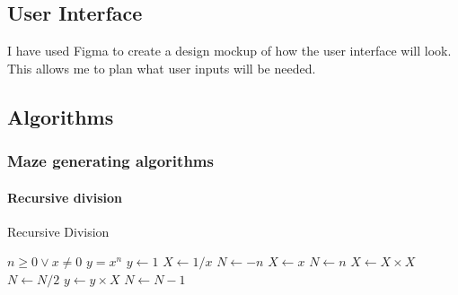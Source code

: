 \documentclass{article}
\newcommand{\comment}[1]{}
\begin{document}
\comment{
\begin{tikzpicture}[node distance = 2cm, auto]
    \node[start] (init) {start};
    \node [io, below of = init] (1) {User selects maze algorithm};
    \node[block, below of = 1] (2) {Generate maze using selected algorithm};
    \node [io, below of=2](3){User selects path finding algorithm};
    \node[decision, below of=3](4){Start button pressed?};
    \node[block, below of=4, yshift=-1cm](5){Visualization runs};
    \node[decision, below of=5](6){Reset button pressed?};
    \node[decision, right of=6, xshift=1cm](7){Nodes moved?};
    \node[block, below of=7, xshift=0.25cm, yshift=-0.5cm](8){Update visualization};
    \node[block, below of=6, yshift=-0.5cm](9){Visualization resets};

    \path[line] (init) -- (1);
    \path[line] (1) -- (2);
    \path[line] (2) -- (3);
    \path[line] (3) -- (4);
    \path[line] (4) -- node {no}(4);
    \path[line] (4) -- node {yes}(5);
    \path[line] (5) -- (6);
    \path[line] (6) -- node {no}(7);
    \path[line] (6) -- node {yes}(9);
    \path[line] (7) -- node {yes}(8);
    \path[line] (7) -- node {no}(6);
    \path[line] (8) -- (6);
    \path[line, anchor=west] (9) -- (init);
\end{tikzpicture}}

\subsection{User Interface}
I have used Figma to create a design mockup of how the user interface will look. This allows me to plan what user inputs will be needed.

\subsection{Algorithms}
\subsubsection{Maze generating algorithms}
\paragraph{Recursive division}
\begin{algorithm}
    \caption{Recursive Division}
    \begin{algorithmic}[1]
        \REQUIRE $n \geq 0 \vee x \neq 0$
        \ENSURE $y = x^n$
        \STATE $y \leftarrow 1$
        \STATE $X \leftarrow 1 / x$
        \STATE $N \leftarrow -n$
        \ELSE
        \STATE $X \leftarrow x$
        \STATE $N \leftarrow n$
        \ENDIF
        \STATE $X \leftarrow X \times X$
        \STATE $N \leftarrow N / 2$
        \ELSE[$N$ is odd]
        \STATE $y \leftarrow y \times X$
        \STATE $N \leftarrow N - 1$
        \ENDIF
        \ENDWHILE
    \end{algorithmic}
    \end{algorithm}
\end{document}

